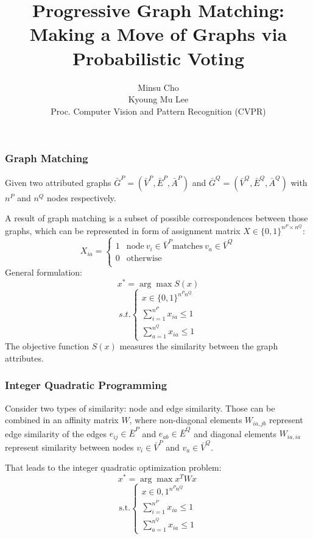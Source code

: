 \documentclass[hyperref={pdfpagelabels=false}]{beamer}
\title{{P}rogressive {G}raph {M}atching:\\
		{M}aking a {M}ove of {G}raphs via {P}robabilistic {V}oting}
\author{Minsu Cho\\
		Kyoung Mu Lee\\
		\vspace{20pt}
		Proc. Computer Vision and Pattern Recognition (CVPR) \text{2012}}
\date{}
\begin{document}
\begin{frame}
\titlepage
\end{frame}
\begin{frame}
\frametitle{Graph Matching}
Given two attributed graphs $\bar{G}^P=(\bar{V}^P, \bar{E}^P, \bar{A}^P)$ and $\bar{G}^Q=(\bar{V}^Q, \bar{E}^Q, \bar{A}^Q)$ with $n^P$ and $n^Q$ nodes respectively.

A result of graph matching is a subset of possible correspondences between those graphs, which can be represented in form of assignment matrix $X\in\{0,1\}^{n^P\times n^Q}$:
$$X_{ia} = \begin{cases} 1 & \mbox{node}\ v_i\in \bar{V}^P \mbox{matches}\ v_a \in \bar{V}^Q \\
						 0 & \mbox{otherwise} \\
			\end{cases}$$
General formulation:
$$x^* = \arg\max S(x)$$
$$ s.t. \begin{cases}
									x\in\{0,1\}^{n^Pn^Q} \\
								 \sum_{i=1}^{n^P}x_{ia}\le 1 \\
								 \sum_{a=1}^{n^Q}x_{ia}\le 1  \end{cases}$$
The objective function $S(x)$ measures the similarity between the graph attributes. 
\end{frame} 

\begin{frame}
\frametitle{Integer Quadratic Programming}

Consider two types of similarity: node and edge similarity. Those can be combined in an affinity matrix $W$, where non-diagonal elements $W_{ia,jb}$ represent edge similarity of the edges $e_{ij}\in \bar{E}^P$ and $e_{ab}\in \bar{E}^Q$ and diagonal elements $W_{ia,ia}$ represent similarity between nodes $v_i\in \bar{V}^P$ and $v_a\in \bar{V}^Q$.

That leads to the integer quadratic optimization problem:\\
$$x^* = \arg\max x^TWx\ $$
$$\mbox{s.t}. \begin{cases}
					x\in{0,1}^{n^Pn^Q} \\
					\sum_{i=1}^{n^P}x_{ia}\le 1 \\
					\sum_{a=1}^{n^Q}x_{ia}\le 1  \end{cases}$$
\end{frame}
\end{document}

